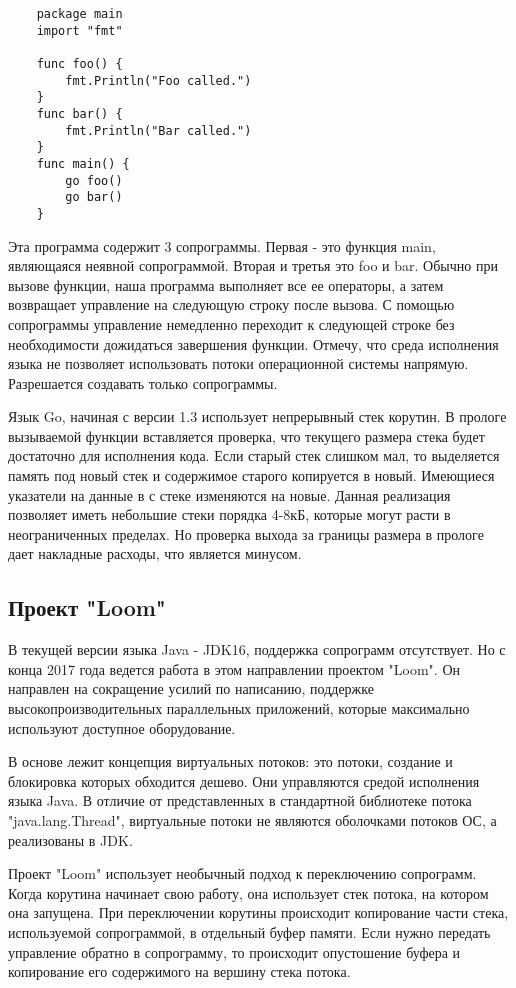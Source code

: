 	\begin{lstlisting}
	package main
	import "fmt"
	
	func foo() {
		fmt.Println("Foo called.")
	}
	func bar() {
		fmt.Println("Bar called.")
	}
	func main() {
		go foo()
		go bar()
	}

	\end{lstlisting}
		
	Эта программа содержит 3 сопрограммы. Первая - это функция main, являющаяся
	неявной сопрограммой. Вторая и третья это foo и bar. Обычно при вызове функции, наша программа 
	выполняет все ее операторы, а затем возвращает управление на следующую строку после вызова. 
	С помощью сопрограммы управление немедленно переходит к следующей строке без необходимости дожидаться завершения функции.
	Отмечу, что среда исполнения языка не позволяет использовать потоки операционной системы
	напрямую. Разрешается создавать только сопрограммы.
	\par
	Язык Go, начиная с версии 1.3 использует непрерывный стек корутин. В прологе вызываемой функции вставляется проверка,
	что текущего размера стека будет достаточно для исполнения кода. Если старый стек слишком мал,
	то выделяется память под новый стек и содержимое старого копируется в новый. Имеющиеся указатели на
	данные в с стеке изменяются на новые. Данная реализация позволяет иметь небольшие стеки порядка 4-8кБ, которые
	могут расти в неограниченных пределах. Но проверка выхода за границы размера в прологе дает накладные расходы,
	что является минусом.
	
	\subsection{Проект "Loom"}
	В текущей версии языка Java - JDK16, поддержка сопрограмм отсутствует. Но с конца 2017 года ведется 
	работа в этом направлении проектом "Loom". Он направлен на сокращение усилий по написанию, поддержке
	высокопроизводительных параллельных приложений, которые максимально используют доступное оборудование.
	\par
	В основе лежит концепция виртуальных потоков: это потоки, создание и блокировка которых обходится
	дешево. Они управляются средой исполнения языка Java. В отличие от представленных в стандартной
	библиотеке потока "java.lang.Thread", виртуальные потоки не являются оболочками потоков ОС, а
	реализованы в JDK.
	
	\par
	Проект "Loom" использует необычный подход к переключению сопрограмм. Когда корутина начинает свою работу, она использует
	стек потока, на котором она запущена. При переключении корутины происходит копирование части стека, используемой сопрограммой, в отдельный буфер памяти. Если нужно передать управление обратно в сопрограмму, то происходит опустошение буфера и копирование его содержимого на вершину стека потока. 
	
\clearpage